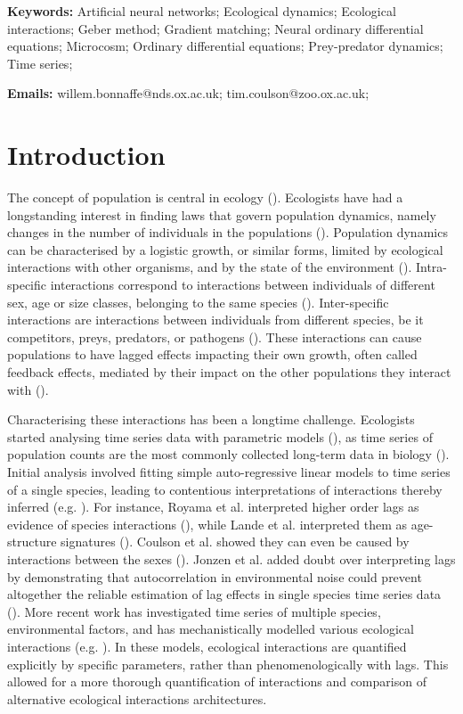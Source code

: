 \documentclass[11pt, oneside]{article}
\begin{document}
\textbf{Keywords:}
Artificial neural networks;
Ecological dynamics;  
Ecological interactions;
Geber method; 
Gradient matching;
Neural ordinary differential equations; 
Microcosm;
Ordinary differential equations; 
Prey-predator dynamics; 
Time series;

\textbf{Emails:}
willem.bonnaffe@nds.ox.ac.uk;
tim.coulson@zoo.ox.ac.uk;

\newpage
{}
\setcounter{page}{1}
{}

\section{Introduction}

The concept of population is central in ecology (\cite{Berryman2002}).
Ecologists have had a longstanding interest in finding laws that govern population dynamics, namely changes in the number of individuals in the populations (\cite{Lawton1999,Turchin1999a}).
Population dynamics can be characterised by a logistic growth, or similar forms, limited by ecological interactions with other organisms, and by the state of the environment (\cite{Turchin2001c,Berryman2003}).
Intra-specific interactions correspond to interactions between individuals of different sex, age or size classes, belonging to the same species (\cite{Turchin2001c}).
Inter-specific interactions are interactions between individuals from different species, be it competitors, preys, predators, or pathogens (\cite{Turchin2001c,Berryman2003}).
These interactions can cause populations to have lagged effects impacting their own growth, often called feedback effects, mediated by their impact on the other populations they interact with (\cite{Berryman1997}).

Characterising these interactions has been a longtime challenge. 
Ecologists started analysing time series data with parametric models (\cite{Royama1984,Kendall1999,Ives2003,Gross2005}), as time series of population counts are the most commonly collected long-term data in biology (\cite{Kendall1999}).
Initial analysis involved fitting simple auto-regressive linear models to time series of a single species, leading to contentious interpretations of interactions thereby inferred (e.g. \cite{Berryman1997}). 
For instance, Royama et al. interpreted higher order lags as evidence of species interactions (\cite{Royama1984}), while Lande et al. interpreted them as age-structure signatures (\cite{Lande2002}). 
Coulson et al. showed they can even be caused by interactions between the sexes (\cite{Mysterud2002}).
Jonzen et al. added doubt over interpreting lags by demonstrating that autocorrelation in environmental noise could prevent altogether the reliable estimation of lag effects in single species time series data (\cite{Jonzen2002}).
More recent work has investigated time series of multiple species, environmental factors, and has mechanistically modelled various ecological interactions (e.g. \cite{Bruijning2019,Rosenbaum2019,Adams2020}).
In these models, ecological interactions are quantified explicitly by specific parameters, rather than phenomenologically with lags.
This allowed for a more thorough quantification of interactions and comparison of alternative ecological interactions architectures.
\end{document}
